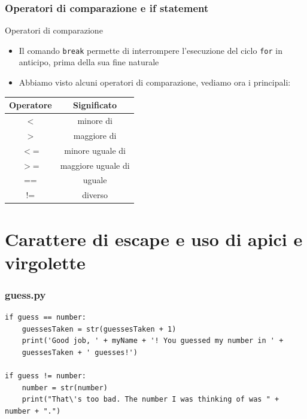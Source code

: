 \documentclass{beamer}
\begin{document}
\begin{frame}[fragile]
\frametitle{Operatori di comparazione e if statement}
\begin{block}{Operatori di comparazione}
	\begin{itemize}
		\item Il comando \texttt{break} permette di interrompere l'esecuzione del ciclo \texttt{for} in anticipo, prima della sua fine naturale
		\item Abbiamo visto alcuni operatori di comparazione, vediamo ora i principali:
	\end{itemize}
\end{block}
\begin{center}
	\begin{tabular}{ c  c }
		\hline
		Operatore & Significato \\ 
		\hline
		$<$ & minore di \\  
		$>$ & maggiore di \\
		$<$= & minore uguale di \\  
		$>$= & maggiore uguale di \\
		== & uguale \\  
		$!$= & diverso 
	\end{tabular}
\end{center}
\end{frame}

\section{Carattere di escape e uso di apici e virgolette}

\begin{frame}[fragile]
\frametitle{guess.py}
	\begin{lstlisting}
if guess == number:
    guessesTaken = str(guessesTaken + 1)
	print('Good job, ' + myName + '! You guessed my number in ' +
	guessesTaken + ' guesses!')
	
if guess != number:
	number = str(number)
	print("That\'s too bad. The number I was thinking of was " + number + ".")
	\end{lstlisting}
\end{frame}
\end{document}
